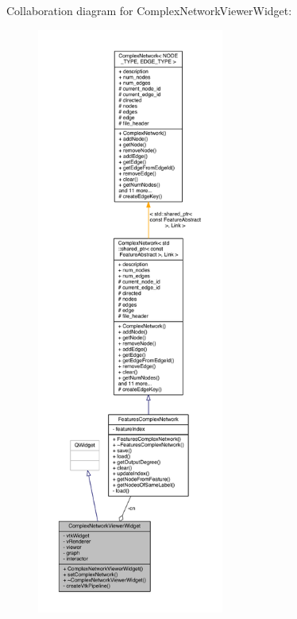 Collaboration diagram for Complex\+Network\+Viewer\+Widget\+:\nopagebreak
\begin{figure}[H]
\begin{center}
\leavevmode
\includegraphics[height=550pt]{class_complex_network_viewer_widget__coll__graph}
\end{center}
\end{figure}


